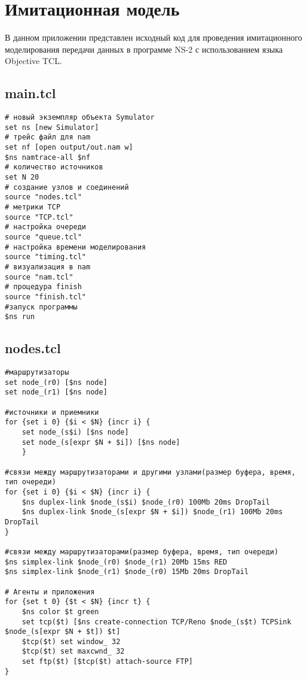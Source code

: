 
\chapter{Имитационная модель}
\label{app1}

В данном приложении представлен исходный код для проведения
имитационного моделирования передачи данных 
в программе NS-2 с использованием языка Objective TCL.

\section*{main.tcl}
\label{app1:sec1}

\begin{verbatim}
# новый экземпляр объекта Symulator
set ns [new Simulator]
# трейс файл для nam
set nf [open output/out.nam w]
$ns namtrace-all $nf
# количество источников 
set N 20
# создание узлов и соединений
source "nodes.tcl"
# метрики TCP
source "TCP.tcl"
# настройка очереди		
source "queue.tcl"
# настройка времени моделирования  		
source "timing.tcl" 		
# визуализация в nam
source "nam.tcl"   		
# процедура finish
source "finish.tcl"                                                                         
#запуск программы
$ns run
\end{verbatim}


\section*{nodes.tcl}
\label{app1:sec2}
\begin{verbatim}
#маршрутизаторы
set node_(r0) [$ns node]  
set node_(r1) [$ns node]  

#источники и приемники
for {set i 0} {$i < $N} {incr i} {
	set node_(s$i) [$ns node] 		
	set node_(s[expr $N + $i]) [$ns node]	
	}

#связи между маршрутизаторами и другими узлами(размер буфера, время, тип очереди)
for {set i 0} {$i < $N} {incr i} {
	$ns duplex-link $node_(s$i) $node_(r0) 100Mb 20ms DropTail
	$ns duplex-link $node_(s[expr $N + $i]) $node_(r1) 100Mb 20ms DropTail
}

#связи между маршрутизаторами(размер буфера, время, тип очереди)
$ns simplex-link $node_(r0) $node_(r1) 20Mb 15ms RED
$ns simplex-link $node_(r1) $node_(r0) 15Mb 20ms DropTail

# Агенты и приложения
for {set t 0} {$t < $N} {incr t} {
	$ns color $t green
	set tcp($t) [$ns create-connection TCP/Reno $node_(s$t) TCPSink $node_(s[expr $N + $t]) $t]
	$tcp($t) set window_ 32
	$tcp($t) set maxcwnd_ 32
	set ftp($t) [$tcp($t) attach-source FTP]
}
\end{verbatim}

